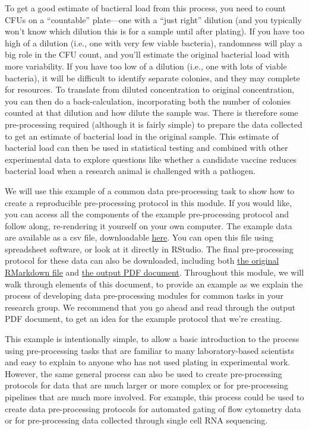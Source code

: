 \documentclass[]{tufte-book}
\begin{document}
To get a good estimate of bactieral load from this process, you need to count
CFUs on a ``countable'' plate---one with a ``just right'' dilution (and you
typically won't know which dilution this is for a sample until after plating).
If you have too high of a dilution (i.e., one with very few viable bacteria),
randomness will play a big role in the CFU count, and you'll estimate the
original bacterial load with more variability. If you have too low of a dilution (i.e., one
with lots of viable bacteria), it will be difficult to identify separate
colonies, and they may complete for resources. To translate from diluted
concentration to original concentration, you can then do a back-calculation,
incorporating both the number of colonies counted at that dilution and how
dilute the sample was. There is therefore some pre-processing required (although
it is fairly simple) to prepare the data collected to get an estimate of
bacterial load in the original sample. This estimate of bacterial load can then be used in
statistical testing and combined with other experimental data to explore
questions like whether a candidate vaccine reduces bacterial load when a research
animal is challenged with a pathogen.

We will use this example of a common data pre-processing task to show how to
create a reproducible pre-processing protocol in this module. If you would like,
you can access all the components of the example pre-processing protocol and
follow along, re-rendering it yourself on your own computer. The example data
are available as a csv file, downloadable
\href{https://raw.githubusercontent.com/geanders/improve_repro/master/data/bactcountr_example_data/cfu_data.csv}{here}.
You can open this file using spreadsheet software, or look at it directly in
RStudio. The final pre-processing protocol for these data can also be
downloaded, including both \href{https://raw.githubusercontent.com/geanders/improve_repro/master/data/bactcountr_example_data/example_protocol.Rmd}{the original RMarkdown
file}
and \href{https://github.com/geanders/improve_repro/raw/master/data/bactcountr_example_data/example_protocol.pdf}{the output PDF
document}.
Throughout this module, we will walk through elements of this document, to
provide an example as we explain the process of developing data pre-processing
modules for common tasks in your research group. We recommend that you go ahead and
read through the output PDF document, to get an idea for the example protocol that
we're creating.

This example is intentionally simple, to allow a basic introduction to the
process using pre-processing tasks that are familiar to many laboratory-based
scientists and easy to explain to anyone who has not used plating in experimental
work. However, the same general process can also be used to create
pre-processing protocols for data that are much larger or more complex or for
pre-processing pipelines that are much more involved.
For example, this process could be used to create data pre-processing protocols
for automated gating of flow cytometry data or for pre-processing data
collected through single cell RNA sequencing.
\end{document}
